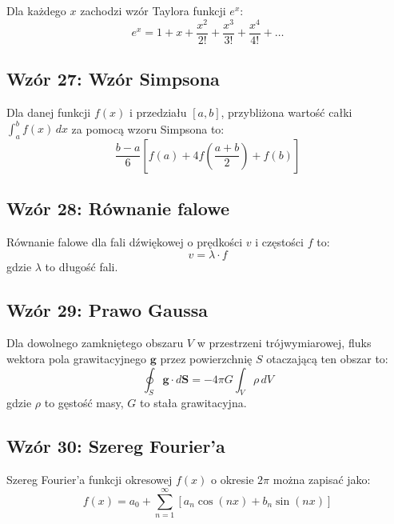 \documentclass{article}
\begin{document}
Dla każdego \(x\) zachodzi wzór Taylora funkcji \(e^x\):
\[ e^x = 1 + x + \frac{x^2}{2!} + \frac{x^3}{3!} + \frac{x^4}{4!} + \ldots \]

\subsection*{Wzór 27: Wzór Simpsona}

Dla danej funkcji \(f(x)\) i przedziału \([a, b]\), przybliżona wartość całki \(\int_{a}^{b} f(x) \,dx\) za pomocą wzoru Simpsona to:
\[ \frac{b-a}{6} \left[f(a) + 4f\left(\frac{a+b}{2}\right) + f(b)\right] \]

\subsection*{Wzór 28: Równanie falowe}

Równanie falowe dla fali dźwiękowej o prędkości \(v\) i częstości \(f\) to:
\[ v = \lambda \cdot f \]
gdzie \(\lambda\) to długość fali.

\subsection*{Wzór 29: Prawo Gaussa}

Dla dowolnego zamkniętego obszaru \(V\) w przestrzeni trójwymiarowej, fluks wektora pola grawitacyjnego \(\mathbf{g}\) przez powierzchnię \(S\) otaczającą ten obszar to:
\[ \oint_S \mathbf{g} \cdot d\mathbf{S} = -4\pi G \int_V \rho \,dV \]
gdzie \(\rho\) to gęstość masy, \(G\) to stała grawitacyjna.

\subsection*{Wzór 30: Szereg Fourier'a}

Szereg Fourier'a funkcji okresowej \(f(x)\) o okresie \(2\pi\) można zapisać jako:
\[ f(x) = a_0 + \sum_{n=1}^{\infty} \left[a_n \cos(nx) + b_n \sin(nx)\right] \]
\end{document}
